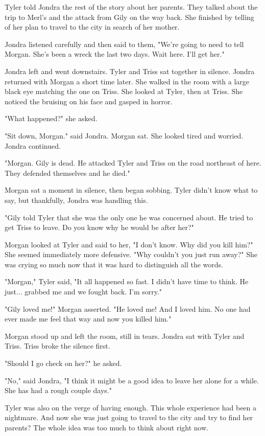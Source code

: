 \documentclass[courier]{sffms}
\begin{document}
Tyler told Jondra the rest of the story about her parents.
They talked about the trip to Merl's and the attack from
Gily on the way back. She finished by telling of her plan
to travel to the city in search of her mother.

Jondra listened carefully and then said to them,
"We're going to need to tell Morgan. She's been a wreck
the last two days. Wait here. I'll get her."

Jondra left and went downstairs. Tyler and Triss sat 
together in silence. Jondra returned with Morgan a short
time later. She walked in the room with
a large black eye matching the one on Triss.
She looked at Tyler, then at Triss. She noticed
the bruising on his face and gasped in horror.

"What happened?" she asked.

"Sit down, Morgan." said Jondra. Morgan sat.
She looked tired and worried. Jondra
continued.

"Morgan. Gily is dead. He attacked Tyler and
Triss on the road northeast of here. They
defended themselves and he died."

Morgan sat a moment in silence, then began
sobbing. Tyler didn't know what to say, but
thankfully, Jondra was handling this.

"Gily told Tyler that she was the only one
he was concerned about. He tried to get
Triss to leave. Do you know why he would
be after her?"

Morgan looked at Tyler and said to her,
"I don't know. Why did you kill him?" She
seemed immediately more defensive.
"Why couldn't you just run away?" She was
crying so much now that it was hard to
distinguish all the words.

"Morgan," Tyler said, "It all happened so
fast. I didn't have time to think. He just...
grabbed me and we fought back. I'm
sorry."

"Gily loved me!" Morgan asserted. "He
loved me! And I loved him. No one had
ever made me feel that way and now you
killed him."

Morgan stood up and left the room, still
in tears. Jondra sat with Tyler and Triss.
Triss broke the silence first.

"Should I go check on her?" he asked.

"No," said Jondra, "I think it might be a
good idea to leave her alone for a while.
She has had a rough couple days."

Tyler was also on the verge of having enough.
This whole experience had been a nightmare.
And now she was just going to travel to the
city and try to find her parents? The whole
idea was too much to think about right now.
\end{document}
